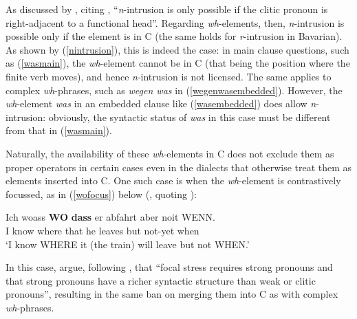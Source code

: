 \ea \label{nintrusion}
\ex[*]{\gll \ldots{} [wege wa]-\textbf{n}-er sich so uffregt \label{wegenwasembedded}\\
{} \phantom{[}because what-N-he REFL so excites\\
\glt `because of what he gets so upset'}
\z
\z

As discussed by \citet[92]{bayerbrandner2008}, citing \citet{ortmann1998}, ``\textit{n}-in\-tru\-sion is only possible if the clitic pronoun is right-adjacent to a functional head''. Regarding \textit{wh}-elements, then, \textit{n}-in\-tru\-sion is possible only if the element is in C (the same holds for \textit{r}-intrusion in Bavarian). As shown by (\ref{nintrusion}), this is indeed the case: in main clause questions, such as (\ref{wasmain}), the \textit{wh}-element cannot be in C (that being the position where the finite verb moves), and hence \textit{n}-intrusion is not licensed. The same applies to complex \textit{wh}-phrases, such as \textit{wegen was} in (\ref{wegenwasembedded}). However, the \textit{wh}-element \textit{was} in an embedded clause like (\ref{wasembedded}) does allow \textit{n}-intrusion: obviously, the syntactic status of \textit{was} in this case must be different from that in (\ref{wasmain}).

Naturally, the availability of these \textit{wh}-elements in C does not exclude them as proper operators in certain cases even in the dialects that otherwise treat them as elements inserted into C. One such case is when the \textit{wh}-element is contrastively focussed, as in (\ref{wofocus}) below (\citealt[93, ex. 18]{bayerbrandner2008}, quoting \citealt[424]{noth1993}):

\ea \gll Ich woass \textbf{WO} \textbf{dass} er abfahrt aber noit WENN. \label{wofocus}\\
I know where that he leaves but not-yet when\\
\glt `I know WHERE it (the train) will leave but not WHEN.'
\z

In this case, \citet[93]{bayerbrandner2008} argue, following \citet{cardinalettistarke1999}, that ``focal stress requires strong pronouns and that strong pronouns have a richer syntactic structure than weak or clitic pronouns'', resulting in the same ban on merging them into C as with complex \textit{wh}-phrases.

